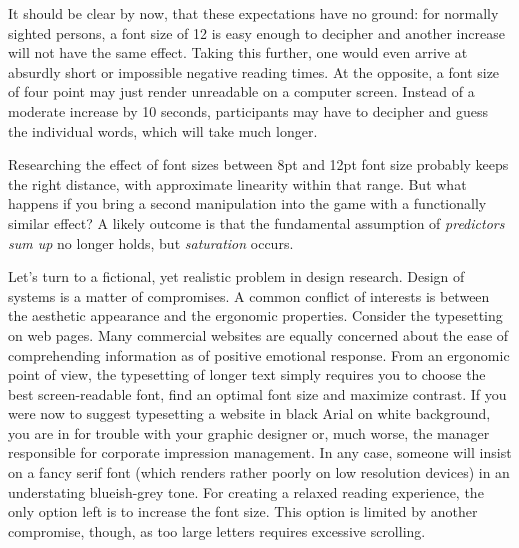 \documentclass[]{svmono}
\newenvironment{Shaded}{\begin{snugshade}}{\end{snugshade}}
\newcommand{\KeywordTok}[1]{\textcolor[rgb]{0.13,0.29,0.53}{\textbf{#1}}}
\newcommand{\DataTypeTok}[1]{\textcolor[rgb]{0.13,0.29,0.53}{#1}}
\newcommand{\DecValTok}[1]{\textcolor[rgb]{0.00,0.00,0.81}{#1}}
\newcommand{\StringTok}[1]{\textcolor[rgb]{0.31,0.60,0.02}{#1}}
\newcommand{\OtherTok}[1]{\textcolor[rgb]{0.56,0.35,0.01}{#1}}
\newcommand{\OperatorTok}[1]{\textcolor[rgb]{0.81,0.36,0.00}{\textbf{#1}}}
\newcommand{\NormalTok}[1]{#1}
\begin{document}
\begin{Shaded}
\end{Shaded}

It should be clear by now, that these expectations have no ground: for
normally sighted persons, a font size of 12 is easy enough to decipher
and another increase will not have the same effect. Taking this further,
one would even arrive at absurdly short or impossible negative reading
times. At the opposite, a font size of four point may just render
unreadable on a computer screen. Instead of a moderate increase by 10
seconds, participants may have to decipher and guess the individual
words, which will take much longer.

Researching the effect of font sizes between 8pt and 12pt font size
probably keeps the right distance, with approximate linearity within
that range. But what happens if you bring a second manipulation into the
game with a functionally similar effect? A likely outcome is that the
fundamental assumption of \emph{predictors sum up} no longer holds, but
\emph{saturation} occurs.

Let's turn to a fictional, yet realistic problem in design research.
Design of systems is a matter of compromises. A common conflict of
interests is between the aesthetic appearance and the ergonomic
properties. Consider the typesetting on web pages. Many commercial
websites are equally concerned about the ease of comprehending
information as of positive emotional response. From an ergonomic point
of view, the typesetting of longer text simply requires you to choose
the best screen-readable font, find an optimal font size and maximize
contrast. If you were now to suggest typesetting a website in black
Arial on white background, you are in for trouble with your graphic
designer or, much worse, the manager responsible for corporate
impression management. In any case, someone will insist on a fancy serif
font (which renders rather poorly on low resolution devices) in an
understating blueish-grey tone. For creating a relaxed reading
experience, the only option left is to increase the font size. This
option is limited by another compromise, though, as too large letters
requires excessive scrolling.
\end{document}
